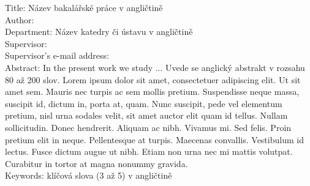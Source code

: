 \noindent
Title: Název bakalářské práce v angličtině\\
Author: \bcAuthor\\
Department: Název katedry či ústavu v angličtině\\
Supervisor: \bcTeacher\\
Supervisor's e-mail address: \bcTeacherMail\\

\noindent Abstract: In the present work we study ... Uvede se anglický abstrakt v rozsahu 80 až 200 slov. Lorem ipsum dolor sit amet, consectetuer adipiscing elit. Ut sit amet sem. Mauris nec turpis ac sem mollis pretium. Suspendisse neque massa, suscipit id, dictum in, porta at, quam. Nunc suscipit, pede vel elementum pretium, nisl urna sodales velit, sit amet auctor elit quam id tellus. Nullam sollicitudin. Donec hendrerit. Aliquam ac nibh. Vivamus mi. Sed felis. Proin pretium elit in neque. Pellentesque at turpis. Maecenas convallis. Vestibulum id lectus. Fusce dictum augue ut nibh. Etiam non urna nec mi mattis volutpat. Curabitur in tortor at magna nonummy gravida.\\

\noindent Keywords: klíčová slova (3 až 5) v angličtině

